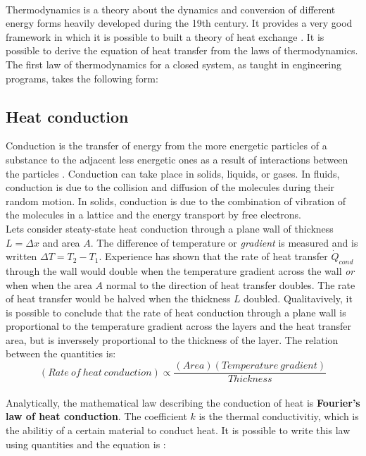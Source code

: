 \\
\break
\normalsize{\indent Thermodynamics is a theory about the dynamics and conversion of different energy forms heavily developed during the 19th century. It provides a very good framework in which it is possible to built a theory of heat exchange \cites{ahtt6e}. It is possible to derive the equation of heat transfer from the laws of thermodynamics. The first law of thermodynamics for a closed system, as taught in engineering programs, takes the following form:}

\subsection{Heat conduction}
\normalsize{Conduction is the transfer of energy from the more energetic particles of a substance to the adjacent less energetic ones as a result of interactions between the particles \cites{cengel2004heat}. Conduction can take place in solids, liquids, or gases. In fluids, conduction is due to the collision and diffusion of the molecules during their random motion. In solids, conduction is due to the combination of vibration of the molecules in a lattice and the energy transport by free electrons.}
\\
\break
\normalsize{\indent Lets consider steaty-state heat conduction through a plane wall of thickness $L  = \Delta x$ and area $A$. The difference of temperature or {\it gradient} is measured and is written $\Delta T = T_2 - T_1$. Experience has shown that the rate of heat transfer $\dot{Q}_{cond}$ through the wall would double when the temperature gradient across the wall {\it or} when when the area $A$ normal to the direction of heat transfer doubles. The rate of heat transfer would be halved when the thickness $L$ doubled. Qualitavively, it is possible to conclude that the rate of heat conduction through a plane wall is proportional to the temperature gradient across the layers and the heat transfer area, but is inverssely proportional to the thickness of the layer. The relation between the quantities is:}
\\
\begin{equation}
    (Rate \ of \ heat \ conduction) \propto \frac{(Area)(Temperature \ gradient)}{Thickness}
    \label{eqn:CondEq}
\end{equation}
\\
\normalsize{\indent Analytically, the mathematical law describing the conduction of heat is {\bfseries Fourier's law of heat conduction}. The coefficient $k$ is the thermal conductivitiy, which is the abilitiy of a certain material to conduct heat. It is possible to write this law using quantities and the equation is :}
